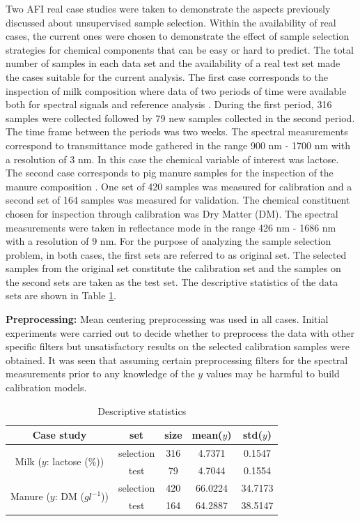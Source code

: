 \documentclass[journal=ancham,manuscript=article]{achemso}
\begin{document}
Two AFI real case studies were taken to demonstrate the aspects previously discussed about unsupervised sample selection. Within the availability of real cases, the current ones were chosen to demonstrate the effect of sample selection strategies for chemical components that can be easy or hard to predict. The total number of samples in each data set and the availability of a real test set made the cases suitable for the current analysis. The first case corresponds to the inspection of milk composition where data of two periods of time were available both for spectral signals and reference analysis \cite{Diaz-Olivares2020}. During the first period, 316 samples were collected followed by 79 new samples collected in the second period. The time frame between the periods was two weeks. The spectral measurements correspond to transmittance mode gathered in the range 900 nm - 1700 nm with a resolution of 3 nm. In this case the chemical variable of interest was lactose. 
The second case corresponds to pig manure samples for the inspection of the manure composition \cite{Saeys2005}. One set of 420 samples was measured for calibration and a second set of 164 samples was measured for validation. The chemical constituent chosen for inspection through calibration was Dry Matter (DM). The spectral measurements were taken in reflectance mode in the range 426 nm - 1686 nm with a resolution of 9 nm.
For the purpose of analyzing the sample selection problem, in both cases, the first sets are referred to as original set. The selected samples from the original set constitute the calibration set and the samples on the second sets are taken as the test set. The descriptive statistics of the data sets are shown in Table \ref{tab_descriptive_statistics}.

\textbf{Preprocessing:} Mean centering preprocessing was used in all cases. Initial experiments were carried out to decide whether to preprocess the data with other specific filters but unsatisfactory results on the selected calibration samples were obtained. It was seen that assuming certain preprocessing filters for the spectral measurements prior to any knowledge of the $y$ values may be harmful to build calibration models. 

\begin{table}[t]
\centering
\begin{tabular}{|c|c|c|c|c|} 
\hline
Case study	& set & size & mean($y$) & std($y$)  	\\
\hline
\multirow{2}{10em}{Milk ($y$: lactose (\%))} & selection & 316 & 4.7371 & 0.1547\\
& test & 79 & 4.7044 & 0.1554\\
\hline
\multirow{2}{10em}{Manure ($y$: DM ($gl^{-1}$))} & selection & 420 & 66.0224 & 34.7173\\
& test & 164 & 64.2887 & 38.5147 \\
\hline 


\end{tabular}
\caption{Descriptive statistics}
\label{tab_descriptive_statistics}
\end{table}
\end{document}
